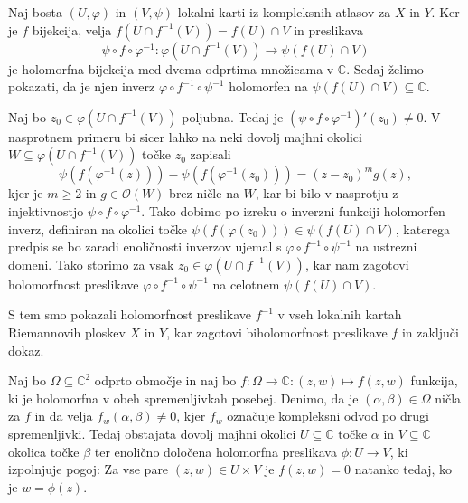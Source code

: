 \documentclass[mat1]{fmfdelo}
\numberwithin{equation}{section}
\newcommand{\C}{\mathbb C}
\newcommand{\inv}{^{-1}}
\newcommand{\hol}[1]{\mathcal{O}(#1)}
\theoremstyle{definition}
\begin{document}
\begin{dokaz}
    Naj bosta $(U, \varphi)$ in $(V, \psi)$ lokalni karti iz kompleksnih atlasov za $X$ in $Y$.
    Ker je $f$ bijekcija, velja $f(U \cap f\inv(V)) = f(U) \cap V$ in preslikava 
    \[
        \psi \circ f \circ \varphi\inv : \varphi(U \cap f\inv(V)) \to \psi(f(U) \cap V)  
    \]
    je holomorfna bijekcija med dvema odprtima množicama v $\C$. Sedaj želimo pokazati, da je njen inverz $\varphi \circ f\inv \circ \psi\inv$ holomorfen na $\psi(f(U) \cap V) \subseteq \C$.

    Naj bo $z_0 \in \varphi(U \cap f\inv(V))$ poljubna. Tedaj je $(\psi \circ f \circ \varphi\inv)'(z_0) \neq 0$. V nasprotnem primeru bi sicer lahko na neki dovolj majhni okolici $W \subseteq \varphi(U \cap f\inv(V))$ točke $z_0$ zapisali 
    \[
        \psi(f(\varphi\inv(z))) - \psi(f(\varphi\inv(z_0))) = (z - z_0)^m g(z),
    \]
    kjer je $m \geq 2$ in $g \in \hol{W}$ brez ničle na $W$, %
    kar bi bilo v nasprotju z injektivnostjo $\psi \circ f \circ \varphi\inv$. Tako dobimo po izreku o inverzni funkciji \cite[Izrek 67]{Globevnik} holomorfen inverz, definiran na okolici točke $\psi(f(\varphi(z_0))) \in \psi(f(U) \cap V)$, katerega predpis se bo zaradi enoličnosti inverzov ujemal s $\varphi \circ f\inv \circ \psi\inv$ na ustrezni domeni. Tako storimo za vsak $z_0 \in \varphi(U \cap f\inv(V))$, kar nam zagotovi holomorfnost preslikave $\varphi \circ f\inv \circ \psi\inv$ %
    na celotnem $\psi(f(U) \cap V)$. 
    
    S tem smo pokazali holomorfnost preslikave $f\inv$ v vseh lokalnih kartah Riemannovih ploskev $X$ in $Y$, kar zagotovi biholomorfnost preslikave $f$ in zaključi dokaz. 
\end{dokaz}

\begin{izrek}
    \label{izrek o impliclitni preslikavi}
    Naj bo $\Omega \subseteq \C^2$ odprto območje in naj bo $f : \Omega \to \C : (z, w) \mapsto f(z,w)$ funkcija, ki je holomorfna v obeh spremenljivkah posebej. Denimo, da je $(\alpha, \beta) \in \Omega$ ničla za $f$ in da velja $f_w(\alpha, \beta) \neq 0$, kjer $f_w$ označuje kompleksni odvod po drugi spremenljivki. Tedaj obstajata dovolj majhni okolici $U \subseteq \C$ točke $\alpha$ in $V \subseteq \C$ okolica točke $\beta$ ter enolično določena holomorfna preslikava $\phi : U \to V$, ki izpolnjuje pogoj: 
    Za vse pare $(z, w) \in U \times V$ je $f(z,w) = 0$ natanko tedaj, ko je $w = \phi(z)$.
    
    

\end{izrek}
\end{document}
